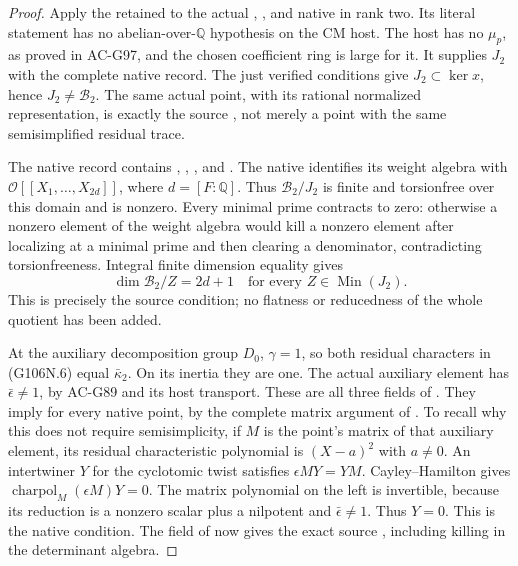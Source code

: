 \begin{proof}
Apply the retained  to the actual
, ,  and
native  in rank two. Its literal statement
has no abelian-over-\(\mathbb Q\) hypothesis on the CM
host. The host has no \(\mu_p\), as proved in AC-G97,
and the chosen coefficient ring is large for it.
It supplies \(J_2\) with the complete native
 record. The just verified 
conditions give \(J_2\subset\ker x\), hence
\(J_2\ne\mathscr B_2\). The same actual point,
with its rational normalized representation, is exactly
the source , not merely
a point with the same semisimplified residual trace.

The native  record contains
, ,
, and .
The native  identifies its weight algebra
with \(\mathcal O[[X_1,\ldots,X_{2d}]]\), where
\(d=[F:\mathbb Q]\).
Thus \(\mathscr B_2/J_2\) is finite and torsionfree
over this domain and is nonzero. Every minimal prime
contracts to zero: otherwise a nonzero element of the
weight algebra would kill a nonzero element after
localizing at a minimal prime and then clearing a
denominator, contradicting torsionfreeness.
Integral finite dimension equality gives
\[
   \dim\mathscr B_2/Z=2d+1
           \quad\text{for every }Z\in\operatorname{Min}(J_2).
\tag{G106N.15}
\]
This is precisely the source  condition;
no flatness or reducedness of the whole quotient has
been added.

At the auxiliary decomposition group \(D_0\),
\(\gamma=1\), so both residual characters in
(G106N.6) equal \(\bar\kappa_2\). On its inertia
they are one. The actual auxiliary element has
\(\bar\epsilon\ne1\), by AC-G89 and its host
transport. These are all three fields of
. They imply  for every
native point, by the complete matrix argument of
. To recall
why this does not require semisimplicity, if \(M\)
is the point's matrix of that auxiliary element, its
residual characteristic polynomial is \((X-a)^2\)
with \(a\ne0\). An intertwiner \(Y\) for the
cyclotomic twist satisfies
\(\epsilon M Y=Y M\). Cayley--Hamilton gives
\(\operatorname{charpol}_M(\epsilon M)Y=0\).
The matrix polynomial on the left is invertible,
because its reduction is a nonzero scalar plus a
nilpotent and \(\bar\epsilon\ne1\).
Thus \(Y=0\). This is the native 
condition. The  field of 
now gives the exact source , including
killing in the determinant algebra.



\end{proof}
